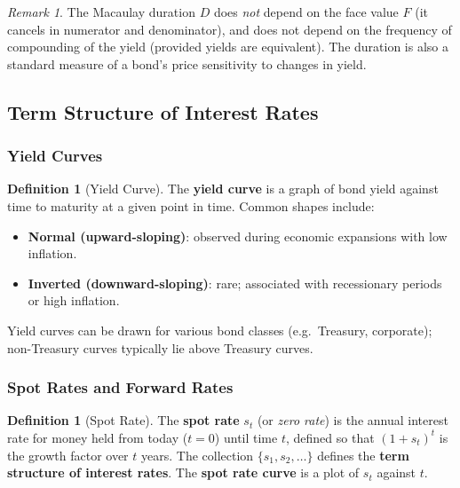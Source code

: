 \documentclass[12pt, a4paper]{article}
\theoremstyle{plain}
\theoremstyle{definition}
\newtheorem{definition}[theorem]{Definition}
\theoremstyle{remark}
\newtheorem{remark}[theorem]{Remark}
\begin{document}
\begin{remark}
  The Macaulay duration $D$ does \emph{not} depend on the face value $F$ (it cancels in numerator and denominator), and does not depend on the frequency of compounding of the yield (provided yields are equivalent). The duration is also a standard measure of a bond's price sensitivity to changes in yield.
\end{remark}

\subsection{Term Structure of Interest Rates}

\subsubsection{Yield Curves}

\begin{definition}[Yield Curve]
  The \textbf{yield curve} is a graph of bond yield against time to maturity at a given point in time. Common shapes include:
  \begin{itemize}
    \item \textbf{Normal (upward-sloping)}: observed during economic expansions with low inflation.
    \item \textbf{Inverted (downward-sloping)}: rare; associated with recessionary periods or high inflation.
  \end{itemize}
  Yield curves can be drawn for various bond classes (e.g.\ Treasury, corporate); non-Treasury curves typically lie above Treasury curves.
\end{definition}

\subsubsection{Spot Rates and Forward Rates}

\begin{definition}[Spot Rate]
  The \textbf{spot rate} $s_t$ (or \emph{zero rate}) is the annual interest rate for money held from today ($t=0$) until time $t$, defined so that $(1+s_t)^t$ is the growth factor over $t$ years. The collection $\{s_1, s_2, \ldots\}$ defines the \textbf{term structure of interest rates}. The \textbf{spot rate curve} is a plot of $s_t$ against $t$.
\end{definition}
\end{document}
